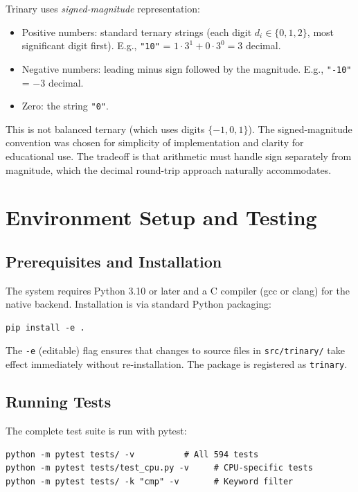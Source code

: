 \documentclass[10pt,a4paper,twoside]{book}
\begin{document}
Trinary uses \emph{signed-magnitude} representation:
\begin{itemize}
    \item Positive numbers: standard ternary strings (each digit $d_i \in \{0,1,2\}$,
          most significant digit first). E.g., \texttt{"10"} = $1\cdot 3^1 + 0\cdot 3^0
          = 3$ decimal.
    \item Negative numbers: leading minus sign followed by the magnitude. E.g.,
          \texttt{"-10"} = $-3$ decimal.
    \item Zero: the string \texttt{"0"}.
\end{itemize}

This is not balanced ternary (which uses digits $\{-1,0,1\}$). The signed-magnitude
convention was chosen for simplicity of implementation and clarity for educational use.
The tradeoff is that arithmetic must handle sign separately from magnitude, which the
decimal round-trip approach naturally accommodates.

\chapter{Environment Setup and Testing}
\label{ch:setup}

\section{Prerequisites and Installation}

The system requires Python 3.10 or later and a C compiler (gcc or clang) for the native
backend. Installation is via standard Python packaging:

\begin{verbatim}
pip install -e .
\end{verbatim}

The \texttt{-e} (editable) flag ensures that changes to source files in
\texttt{src/trinary/} take effect immediately without re-installation. The package is
registered as \texttt{trinary}.

\section{Running Tests}

The complete test suite is run with pytest:

\begin{verbatim}
python -m pytest tests/ -v          # All 594 tests
python -m pytest tests/test_cpu.py -v     # CPU-specific tests
python -m pytest tests/ -k "cmp" -v       # Keyword filter
\end{verbatim}
\end{document}
